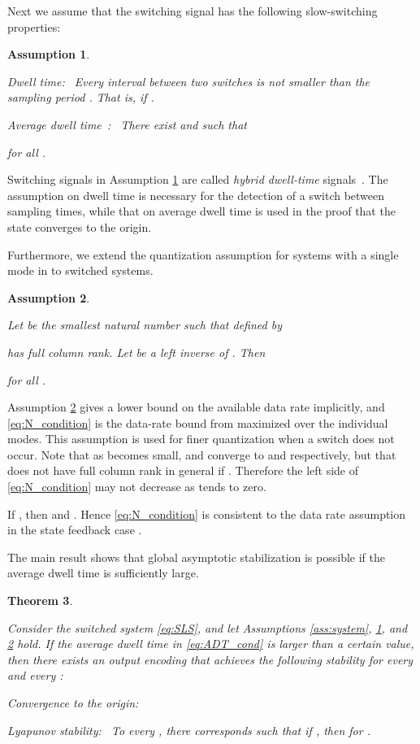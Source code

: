 \documentclass[letterpaper, 11pt, onecolumn]{ieeeconf}  \IEEEoverridecommandlockouts
\newtheorem{theorem}{Theorem}[section]
\newtheorem{assumption}[theorem]{Assumption}
\begin{document}
Next we assume that the switching signal  has
the following slow-switching properties:
\begin{assumption}
\label{ass:switching_time}
{\em
{\sl Dwell time:~}
Every interval between two switches is not smaller than
the sampling period . That is, 
 if .

{\sl Average dwell time~\cite{Hespanha1999CDC}:~}
There exist  and  such that

for all .
}
\end{assumption}

Switching signals in
Assumption \ref{ass:switching_time} are called 
{\em hybrid dwell-time} signals~\cite{Vu2011, Liberzon2014}.
The assumption on dwell time is necessary for the
detection of a switch between sampling times,
while that on average dwell time is used in the proof that the state
converges to the origin.

Furthermore, we extend the quantization assumption for 
systems with a single mode in \cite{Liberzon2003} to
switched systems.
\begin{assumption}
\label{ass:quantization}
{\em
Let  be the smallest natural number such that
 defined by

has full column rank.
Let  be a left inverse of .
Then 

for all .
}
\end{assumption}

Assumption \ref{ass:quantization} gives a lower bound on the available data rate
implicitly, and
\eqref{eq:N_condition} is the data-rate bound from \cite{Liberzon2003} 
maximized over the individual modes.
This assumption is used for finer quantization when a switch does not occur.
Note that as  becomes small,
 and 
converge to  and  respectively, but that  does not have full column 
rank in general
if .
Therefore
the left side of \eqref{eq:N_condition} may not decrease 
as  tends to zero.

If , then  and .
Hence \eqref{eq:N_condition} is consistent to
the data rate assumption in the state feedback case \cite{Liberzon2014}.


The main result shows that
global asymptotic stabilization is possible if
the average dwell time is sufficiently large.
\begin{theorem}
\label{thm:stability_theorem2}
{\em
Consider the switched system \eqref{eq:SLS}, and let 
Assumptions \ref{ass:system}, \ref{ass:switching_time}, and 
\ref{ass:quantization} hold.
If the average dwell time  in \eqref{eq:ADT_cond} 
is larger than a certain value, then
there exists an output encoding that achieves the following stability
for every  and every :

\noindent
{\sl Convergence to the origin:~}


\noindent
{\sl Lyapunov stability:~}
To every , there corresponds  such that
if , then 
for .
}
\end{theorem}
\end{document}
